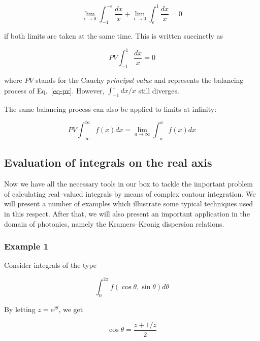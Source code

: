 \begin{equation}
\lim_{\epsilon \to 0} \int_{-1}^{-\epsilon} \frac{dx}{x} + \lim_{\epsilon \to 0}
\int_{\epsilon}^1 \frac{dx}{x} = 0 \label{eq-pv}
\end{equation}  

if both limits are taken at the same time. This is written succinctly as

\begin{equation}
PV \int_{-1}^1 \frac{dx}{x} = 0
\end{equation} 

where $PV$ stands for the Cauchy \emph{principal value} and represents the
balancing process of Eq.~\ref{eq-pv}. However, $\int_{-1}^1 dx / x$ still
diverges.

The same balancing process can also be applied to limits at infinity:

\begin{equation}
PV \int_{-\infty}^\infty f(x) dx = \lim_{a \to \infty} \int_{-a}^{a} f(x) dx
\end{equation} 


\subsection{Evaluation of integrals on the real axis}

Now we have all the necessary tools in our box to tackle the important problem
of calculating real--valued integrals by means of complex contour integration.
We will present a number of examples which illustrate some typical techniques
used in this respect. After that, we will also present an important application
in the domain of photonics, namely the Kramers--Kronig dispersion relations.

\subsubsection{Example 1}

Consider integrals of the type

\begin{equation}
\int_0^{2 \pi} f(\cos \theta, \sin \theta) d \theta \label{eq-cont-int-1}
\end{equation} 

By letting $z=e^{j \theta}$, we get 

\begin{equation}
\cos \theta = \frac{z + 1/z}{2}
\end{equation} 


